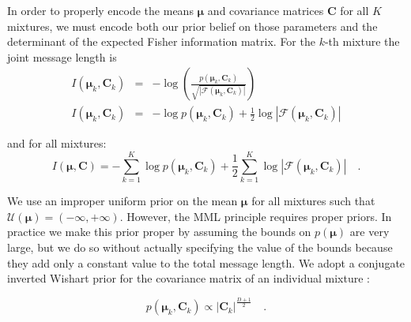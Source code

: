 \documentclass{elsarticle}
\newcommand{\todo}[1]{\textcolor{red}{#1}}
\newcommand{\vect}[1]{\boldsymbol{\mathbf{#1}}}
\def\cov{C}
\def\veccov{\vect{\cov}}
\def\vecmean{\vect{\mu}}
\newcommand{\fisher}[1]{\mathcal{F}\left(#1\right)}
\newcommand{\detfisher}[1]{\left|\fisher{#1}\right|}
\newcommand{\prior}[1]{p\left(#1\right)}
\begin{document}
In order to properly encode the means $\vecmean$ and covariance matrices
$\veccov$ for all $K$ mixtures, we must encode both our prior belief on 
those parameters and the determinant of the expected Fisher information 
matrix. For the $k$-th mixture the joint message length is
\begin{eqnarray}
  I(\vecmean_k,\veccov_k) &=& -\log{\left(\frac{\prior{{\vecmean_k,\veccov_k}}}{\sqrt{\detfisher{{\vecmean_k,\veccov_k}}}}\right)} \nonumber \\ 
  I(\vecmean_k,\veccov_k) &=& -\log{\prior{{\vecmean_k,\veccov_k}}} + \frac{1}{2}\log{\detfisher{{\vecmean_k,\veccov_k}}}
\end{eqnarray}

\noindent{}and for all mixtures:
\begin{equation}
  I(\vecmean,\veccov) = -\sum_{k=1}^{K}\log{\prior{{\vecmean_k,\veccov_k}}} + \frac{1}{2}\sum_{k=1}^{K}\log{\detfisher{{\vecmean_k,\veccov_k}}} \quad .
  \label{eq:I_component_params}
\end{equation}

We use an improper uniform prior on the mean $\vecmean$ for all mixtures such
that 
    $\mathcal{U}(\vecmean) = (-\infty, +\infty)$.
However,  the MML principle requires proper priors. In practice we make 
this prior proper by assuming the bounds on $\prior{\vecmean}$ are very large, but 
we do so without actually specifying the value of the bounds because they add 
only a constant value to the total message length\todo{\cite{someone}}.
We adopt a conjugate inverted Wishart prior for the covariance matrix of an
individual mixture \cite[Section 5.2.3]{Schafer_1997}:

\begin{equation}
  \prior{{\vecmean_k, \veccov_k}} \propto |\veccov_k|^{\frac{D+1}{2}} \quad .
  \label{eq:covariance-prior}
\end{equation}
\end{document}
